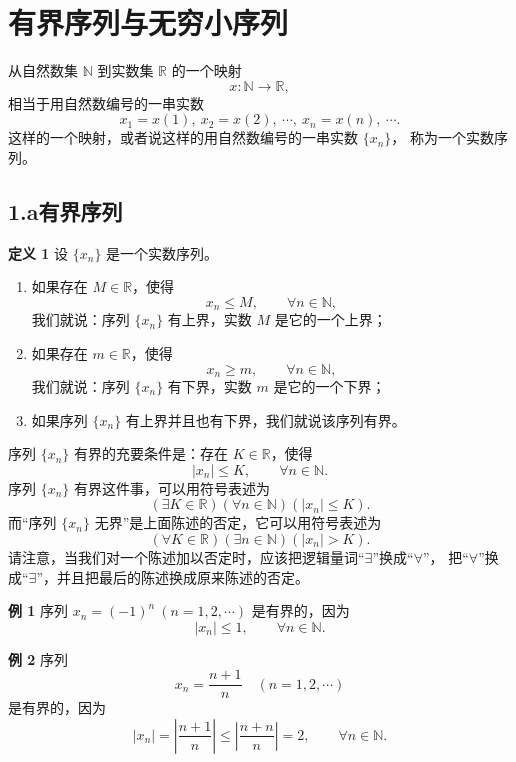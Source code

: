 \documentclass[12pt,a4paper,oneside]{ctexbook}
\begin{document}
\else%
\fi

\section{有界序列与无穷小序列}

从自然数集 $\mathbb{N}$ 到实数集 $\mathbb{R}$ 的一个映射
\[
    x:\mathbb{N}\to\mathbb{R},
\]
相当于用自然数编号的一串实数
\[
    x_1=x(1),\ x_2=x(2),\ \cdots,\ x_n=x(n),\ \cdots .
\]
这样的一个映射，或者说这样的用自然数编号的一串实数 $\{x_n\}$，
称为一个实数序列。

\subsection*{1.a\quad 有界序列}

\textbf{定义 1}\quad
设 $\{x_n\}$ 是一个实数序列。
\begin{enumerate}[label=(\arabic*)]
  \item 如果存在 $M\in\mathbb{R}$，使得
  \[
      x_n\le M,\qquad \forall n\in\mathbb{N},
  \]
  我们就说：序列 $\{x_n\}$ 有上界，实数 $M$ 是它的一个上界；

  \item 如果存在 $m\in\mathbb{R}$，使得
  \[
      x_n\ge m,\qquad \forall n\in\mathbb{N},
  \]
  我们就说：序列 $\{x_n\}$ 有下界，实数 $m$ 是它的一个下界；

  \item 如果序列 $\{x_n\}$ 有上界并且也有下界，我们就说该序列有界。
\end{enumerate}

序列 $\{x_n\}$ 有界的充要条件是：存在 $K\in\mathbb{R}$，使得
\[
    |x_n|\le K,\qquad \forall n\in\mathbb{N}.
\]
序列 $\{x_n\}$ 有界这件事，可以用符号表述为
\[
    (\exists K\in\mathbb{R})(\forall n\in\mathbb{N})(|x_n|\le K).
\]
而“序列 $\{x_n\}$ 无界”是上面陈述的否定，它可以用符号表述为
\[
    (\forall K\in\mathbb{R})(\exists n\in\mathbb{N})(|x_n|>K).
\]
请注意，当我们对一个陈述加以否定时，应该把逻辑量词“$\exists$”换成“$\forall$”，
把“$\forall$”换成“$\exists$”，并且把最后的陈述换成原来陈述的否定。

\medskip
\textbf{例 1}\quad
序列 $x_n=(-1)^n\ (n=1,2,\cdots)$ 是有界的，因为
\[
    |x_n|\le 1,\qquad \forall n\in\mathbb{N}.
\]

\medskip
\textbf{例 2}\quad
序列
\[
    x_n=\frac{n+1}{n}\quad (n=1,2,\cdots)
\]
是有界的，因为
\[
    |x_n|=\left|\frac{n+1}{n}\right|
    \le \left|\frac{n+n}{n}\right|=2,\qquad \forall n\in\mathbb{N}.
\]
\end{document}
